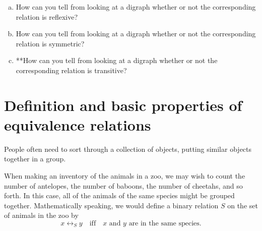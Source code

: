 \begin{exercise}{21}
\begin{enumerate}[(a)]
\item
How can you tell from looking at a digraph whether or not the corresponding relation is reflexive?
\item
How can you tell from looking at a digraph whether or not the corresponding relation is symmetric? 
\item
**How can you tell from looking at a digraph whether or not the corresponding relation is transitive?
\end{enumerate}
\end{exercise}





\section{Definition and basic properties of equivalence relations} \label{EquivalenceRelationsDefnSect}

People often need to sort through a collection of objects, putting similar objects together in a group. 

\begin{eg} \label{EquivRelZooEg}
When making an inventory of the animals in a zoo, we may wish to count the number of antelopes, the number of baboons, the number of cheetahs, and so forth. In this case, all of the animals of the same species might be grouped together. Mathematically speaking, we would define a binary relation $S$ on the set of animals in the zoo by 
\[x \rel_S y \quad \text{iff} \quad x \text{ and } y \text{ are in the same species} .\]
\end{eg}


